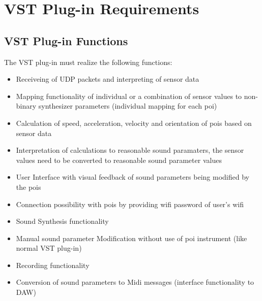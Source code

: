 \newpage
\section{VST Plug-in Requirements}

\subsection{VST Plug-in Functions}
\begin{description}
	\item The VST plug-in must realize the following functions:
\end{description}
\begin{itemize}
	\item Receiveing of UDP packets and interpreting of sensor data
	\item Mapping functionality of individual or a combination of sensor values to non-binary synthesizer parameters (individual mapping for each poi)
	\item Calculation of speed, acceleration, velocity and orientation of pois based on sensor data
	\item Interpretation of calculations to reasonable sound paramaters, the sensor values need to be converted to reasonable sound parameter values
	\item User Interface with visual feedback of sound parameters being modified by the pois
	\item Connection possibility with pois by providing wifi password of user's wifi
	\item Sound Synthesis functionality
	\item Manual sound parameter Modification without use of poi instrument (like normal VST plug-in)
	\item Recording functionality
	\item Conversion of sound parameters to Midi messages (interface functionality to DAW)
\end{itemize}
\newpage
